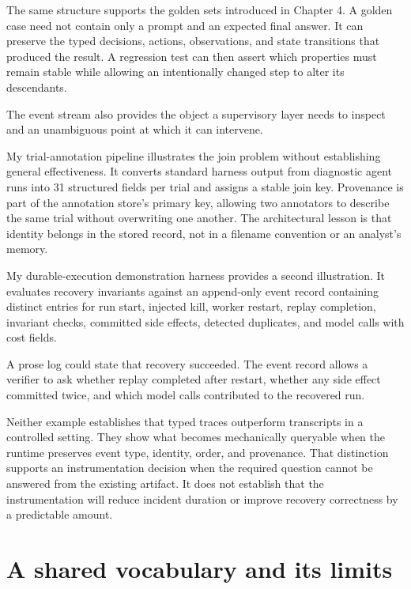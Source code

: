 The same structure supports the golden sets introduced in Chapter 4. A golden case need not contain only a prompt and an expected final answer. It can preserve the typed decisions, actions, observations, and state transitions that produced the result. A regression test can then assert which properties must remain stable while allowing an intentionally changed step to alter its descendants.

The event stream also provides the object a supervisory layer needs to inspect and an unambiguous point at which it can intervene.

My trial-annotation pipeline illustrates the join problem without establishing general effectiveness. It converts standard harness output from diagnostic agent runs into 31 structured fields per trial and assigns a stable join key. Provenance is part of the annotation store's primary key, allowing two annotators to describe the same trial without overwriting one another. The architectural lesson is that identity belongs in the stored record, not in a filename convention or an analyst's memory.

My durable-execution demonstration harness provides a second illustration. It evaluates recovery invariants against an append-only event record containing distinct entries for run start, injected kill, worker restart, replay completion, invariant checks, committed side effects, detected duplicates, and model calls with cost fields.

A prose log could state that recovery succeeded. The event record allows a verifier to ask whether replay completed after restart, whether any side effect committed twice, and which model calls contributed to the recovered run.

Neither example establishes that typed traces outperform transcripts in a controlled setting. They show what becomes mechanically queryable when the runtime preserves event type, identity, order, and provenance. That distinction supports an instrumentation decision when the required question cannot be answered from the existing artifact. It does not establish that the instrumentation will reduce incident duration or improve recovery correctness by a predictable amount.

\hypertarget{a-shared-vocabulary-and-its-limits}{%
\section{A shared vocabulary and its limits}\label{a-shared-vocabulary-and-its-limits}}

